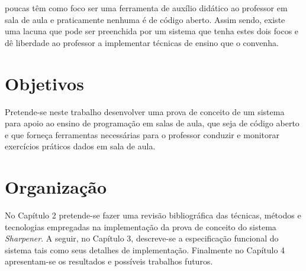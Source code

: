 poucas 
têm como foco ser uma ferramenta de auxílio didático ao professor em sala de aula e 
praticamente nenhuma é de código aberto. Assim sendo, existe uma lacuna que pode
ser preenchida por um sistema que tenha estes dois focos e dê liberdade ao professor 
a implementar técnicas de ensino que o convenha.


\section{Objetivos}
Pretende-se neste trabalho desenvolver uma prova de conceito de um sistema para apoio 
ao ensino de programação em salas de aula, que seja de código aberto e que forneça 
ferramentas necessárias para o professor conduzir e monitorar exercícios práticos dados 
em sala de aula.

\section{Organização}
No Capítulo 2 pretende-se fazer uma revisão bibliográfica das técnicas, métodos e tecnologias
empregadas na implementação 
da prova de conceito do sistema \emph{Sharpener}. A seguir, no Capítulo 3, descreve-se a especificação 
funcional do sistema tais como seus detalhes de implementação. Finalmente no Capítulo 4 apresentam-se 
os resultados e possíveis trabalhos futuros.
